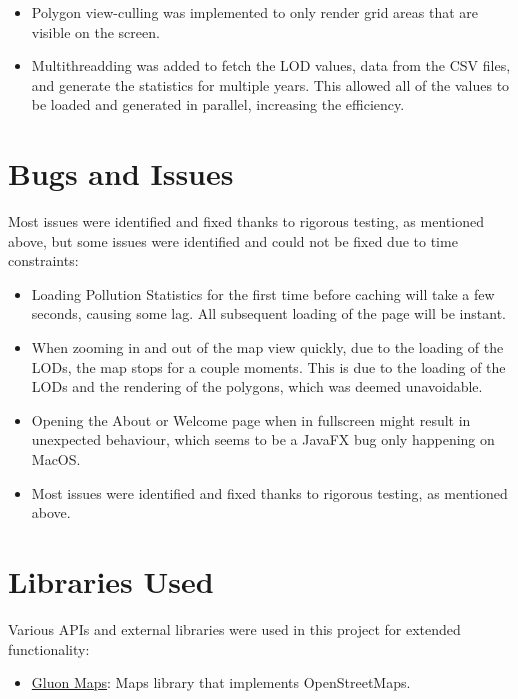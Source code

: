 \documentclass[10pt, a4paper]{scrartcl}
\begin{document}
\begin{multicols}{2}
\begin{itemize}
    \item Polygon view-culling was implemented to only render grid areas that are visible on the screen.
    
    \item Multithreadding was added to fetch the LOD values, data from the CSV files, and generate the statistics for
    multiple years. This allowed all of the values to be loaded and generated in parallel, increasing the efficiency.
\end{itemize}

\section{Bugs and Issues}

Most issues were identified and fixed thanks to rigorous testing, as mentioned above, but some issues were identified
and could not be fixed due to time constraints:

\begin{itemize}
    \itemsep-0.3em
    \item Loading Pollution Statistics for the first time before caching will take a few seconds, causing some lag. All
    subsequent loading of the page will be instant.
    
    \item When zooming in and out of the map view quickly, due to the loading of the LODs, the map stops for a couple
    moments. This is due to the loading of the LODs and the rendering of the polygons, which was deemed unavoidable.

    \item Opening the About or Welcome page when in fullscreen might result in unexpected behaviour, which seems to be 
    a JavaFX bug only happening on MacOS.
        
    \item Most issues were identified and fixed thanks to rigorous testing, as mentioned above.
\end{itemize}

\section{Libraries Used}

\noindent Various APIs and external libraries were used in this project for extended functionality:

\begin{itemize}
    \itemsep-0.3em
    \item \href{https://github.com/gluonhq/maps}{Gluon Maps}: Maps library that implements OpenStreetMaps.


\end{itemize}
\end{multicols}
\end{document}
